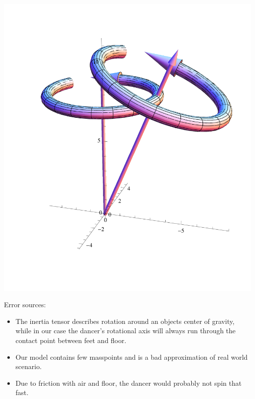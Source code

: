 \documentclass[10pt,DIV10,a4paper]{scrartcl}
\begin{document}
\includegraphics[width=\textwidth]{unwucht.png}

Error sources:

\begin{itemize}
    \item The inertia tensor describes rotation around an objects center of gravity, while in our case the dancer's rotational axis will always run through the contact point between feet and floor.
    \item Our model contains few masspoints and is a bad approximation of real world scenario.
    \item Due to friction with air and floor, the dancer would probably not spin that fast.
\end{itemize}
\end{document}
